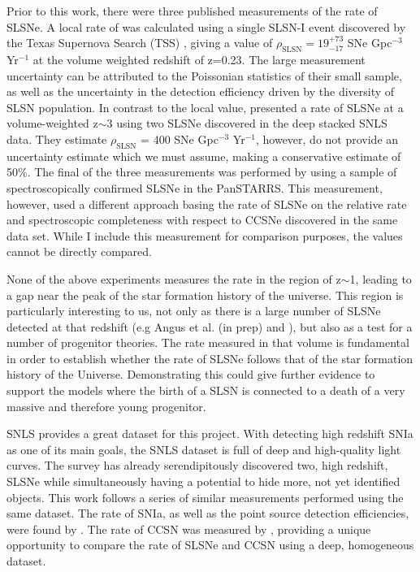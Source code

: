 Prior to this work, there were three published measurements of the rate of SLSNe. A local rate of was calculated using a single SLSN-I event discovered by the Texas Supernova Search (TSS) \citep{Quimby2014}, giving a value of $\rho_{\mathrm{SLSN}} = 19^{+73}_{-17}$ SNe Gpc$^{-3}$ Yr$^{-1}$ at the volume weighted redshift of z=0.23. The large measurement uncertainty can be attributed to the Poissonian statistics of their small sample, as well as the uncertainty in the detection efficiency driven by the diversity of SLSN population. In contrast to the local value, \citet{Cooke2012} presented a rate of SLSNe at a volume-weighted z$\sim$3 using two SLSNe discovered in the deep stacked SNLS data. They estimate $\rho_{\mathrm{SLSN}}$ = 400 SNe Gpc$^{-3}$ Yr$^{-1}$, however, do not provide an uncertainty estimate which we must assume, making a conservative estimate of 50\%. The final of the three measurements was performed by \citet{McCrum2014} using a sample of spectroscopically confirmed SLSNe in the PanSTARRS. This measurement, however, used a different approach basing the rate of SLSNe on the relative rate and spectroscopic completeness with respect to CCSNe discovered in the same data set. While I include this measurement for comparison purposes, the values cannot be directly compared.

None of the above experiments measures the rate in the region of z$\sim$1, leading to a gap near the peak of the star formation history of the universe. This region is particularly interesting to us, not only as there is a large number of SLSNe detected at that redshift (e.g Angus et al. (in prep) and \citet{Lunnan2014}), but also as a test for a number of progenitor theories. The rate measured in that volume is fundamental in order to establish whether the rate of SLSNe follows that of the star formation history of the Universe. Demonstrating this could give further evidence to support the models where the birth of a SLSN is connected to a death of a very massive and therefore young progenitor.

SNLS provides a great dataset for this project. With detecting high redshift SNIa as one of its main goals, the SNLS dataset is full of deep and high-quality light curves. The survey has already serendipitously discovered two, high redshift, SLSNe \citep{Howell2013} while simultaneously having a potential to hide more, not yet identified objects. This work follows a series of similar measurements performed using the same dataset. The rate of SNIa, as well as the point source detection efficiencies, were found by \citet{Perrett2012}. The rate of CCSN was measured by \citet{Bazin2009}, providing a unique opportunity to compare the rate of SLSNe and CCSN using a deep, homogeneous dataset.

